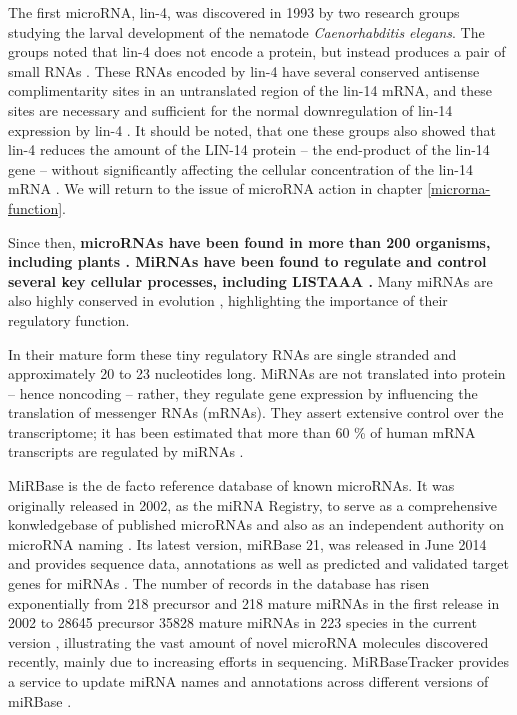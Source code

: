 The first microRNA, lin-4, was discovered in 1993 by two research groups
studying the larval development of the nematode \emph{Caenorhabditis elegans}.
The groups noted that lin-4 does not encode a protein, but instead produces a
pair of small RNAs \citep{Lee1993}. These RNAs encoded by lin-4 have several
conserved antisense complimentarity sites in an untranslated region of the
lin-14 mRNA, and these sites are necessary and sufficient for the normal
downregulation of lin-14 expression by lin-4 \citep{Lee1993,Wightman1993}. It
should be noted, that one these groups also showed that lin-4 reduces the
amount of the LIN-14 protein -- the end-product of the lin-14 gene -- without
significantly affecting the cellular concentration of the lin-14 mRNA
\citep{??}. We will return to the issue of microRNA action in chapter
\ref{microrna-function}.

Since then,
\textbf{microRNAs have been found in more than 200 organisms, including plants
\citep{CITE}. MiRNAs have been found to regulate and control several key cellular
processes, including LISTAAA \citep{CITE}.} Many miRNAs are also highly
conserved in evolution \citep{Bartel2004}, highlighting the importance of
their regulatory function.

In their mature form these tiny regulatory RNAs are single stranded and
approximately 20 to 23 nucleotides long. MiRNAs are not translated into
protein -- hence noncoding -- rather, they regulate gene expression by
influencing the translation of messenger RNAs (mRNAs). They assert
extensive control over the transcriptome; it has been estimated that more
than 60 \% of human mRNA transcripts are regulated by miRNAs
\citep{CITE}.

MiRBase is the de facto reference database of known microRNAs. It was
originally released in 2002, as the miRNA Registry, to serve as a
comprehensive konwledgebase of published microRNAs and also as an independent
authority on microRNA naming \citep{Griffiths2004}. Its latest version,
miRBase 21, was released in June 2014 \citep{MiRBaseWeb} and provides sequence
data, annotations as well as predicted and validated target genes for miRNAs
\citep{Kozomara2014}. The number of records in the database has risen
exponentially from 218 precursor and 218 mature miRNAs in the first release in
2002 to 28645 precursor 35828 mature miRNAs in 223 species in the current
version
\citep{VanPeer2014,MiRBaseWeb}, illustrating the vast amount of novel microRNA
molecules discovered recently, mainly due to increasing efforts in sequencing.
MiRBaseTracker provides a service to update miRNA names and annotations across
different versions of miRBase \citep{VanPeer2014}.





